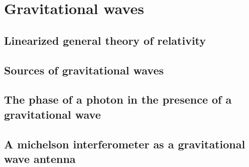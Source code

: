 \chapter{Gravitational waves}

\section{Linearized general theory of relativity}

\section{Sources of gravitational waves}

\section{The phase of a photon in the presence of a gravitational wave}

\section{A michelson interferometer as a gravitational wave antenna}
